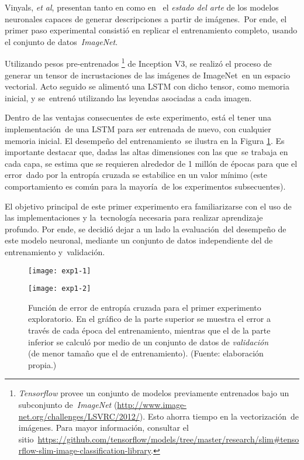 \noindent
Vinyals, \emph{et al}, presentan tanto en \cite{DBLP:journals/corr/VinyalsTBE14} como en \cite{DBLP:journals/corr/VinyalsTBE16}\
el \emph{estado del arte} de los modelos neuronales capaces de generar descripciones a partir de imágenes.\
Por ende, el primer paso experimental consistió en replicar el entrenamiento completo, usando el conjunto de datos\
\emph{ImageNet}.\par
Utilizando pesos pre-entrenados%
\footnote{
  \emph{Tensorflow} provee un conjunto de modelos previamente entrenados bajo un subconjunto de\
  \emph{ImageNet} (\url{http://www.image-net.org/challenges/LSVRC/2012/}). Esto ahorra tiempo en la vectorización\
  de imágenes. Para mayor información, consultar el sitio\
  \url{https://github.com/tensorflow/models/tree/master/research/slim\#tensorflow-slim-image-classification-library}.
} de Inception V3, se realizó el proceso de generar un tensor de incrustaciones de las imágenes de ImageNet\
en un espacio vectorial. Acto seguido se alimentó una LSTM con dicho tensor, como memoria inicial, y se\
entrenó utilizando las leyendas asociadas a cada imagen.\par
Dentro de las ventajas consecuentes de este experimento, está el tener una implementación\
de una LSTM para ser entrenada de nuevo, con cualquier memoria inicial. El desempeño del entrenamiento\
se ilustra en la Figura \ref{exp1}. Es importante destacar que, dadas las altas dimensiones con las que\
se trabaja en cada capa, se estima que se requieren alrededor de 1 millón de épocas para que el error\
dado por la entropía cruzada se estabilice en un valor mínimo (este comportamiento es común para la mayoría\
de los experimentos subsecuentes).\par
El objetivo principal de este primer experimento era familiarizarse con el uso de las implementaciones y la\
tecnología necesaria para realizar aprendizaje profundo. Por ende, se decidió dejar a un lado la evaluación\
del desempeño de este modelo neuronal, mediante un conjunto de datos independiente del de entrenamiento y\
validación.

\begin{figure}[H]
  \centering
  \begin{minipage}[c]{\linewidth}
    \texttt{[image: exp1-1]}
  \end{minipage}\hfill
  \begin{minipage}[c]{\linewidth}
    \texttt{[image: exp1-2]}
  \end{minipage}
  \caption{
    Función de error de entropía cruzada para el primer experimento exploratorio.
    En el gráfico de la parte superior se muestra el error
    a través de cada época del entrenamiento, mientras que el de la parte inferior se
    calculó por medio de un conjunto de datos de \emph{validación} (de menor tamaño que el de entrenamiento).
    (Fuente: elaboración propia.)
  }
  \label{exp1}
\end{figure}

